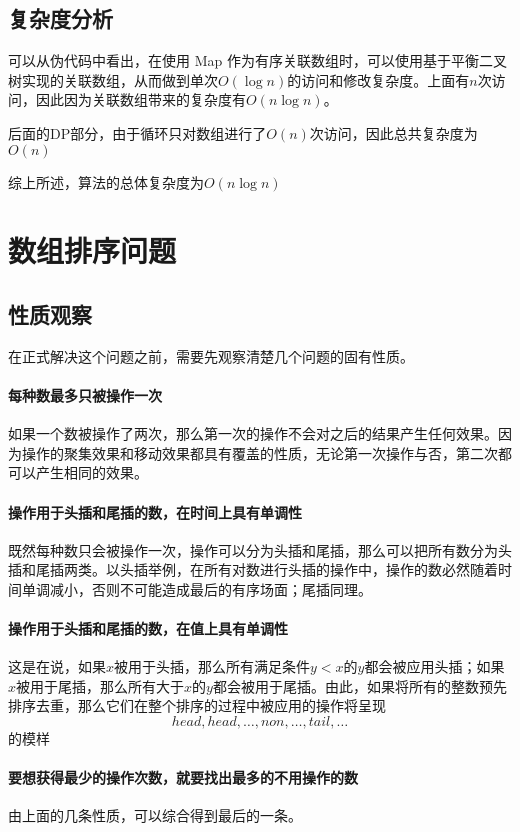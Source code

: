 \documentclass[UTF8]{ctexart}
\begin{document}
    \subsection*{复杂度分析}
        可以从伪代码中看出，在使用 Map 作为有序关联数组时，可以使用基于平衡二叉树实现的关联数组，从而做到单次$O(\log n)$的访问和修改复杂度。上面有$n$次访问，因此因为关联数组带来的复杂度有$O(n\log n)$。

        后面的DP部分，由于循环只对数组进行了$O(n)$次访问，因此总共复杂度为$O(n)$

        综上所述，算法的总体复杂度为$O(n \log n)$

\section{数组排序问题} %
    \subsection*{性质观察}
        在正式解决这个问题之前，需要先观察清楚几个问题的固有性质。
        
        \paragraph*{每种数最多只被操作一次}
            如果一个数被操作了两次，那么第一次的操作不会对之后的结果产生任何效果。因为操作的聚集效果和移动效果都具有覆盖的性质，无论第一次操作与否，第二次都可以产生相同的效果。

        \paragraph*{操作用于头插和尾插的数，在时间上具有单调性}
            既然每种数只会被操作一次，操作可以分为头插和尾插，那么可以把所有数分为头插和尾插两类。以头插举例，在所有对数进行头插的操作中，操作的数必然随着时间单调减小，否则不可能造成最后的有序场面；尾插同理。

        \paragraph*{操作用于头插和尾插的数，在值上具有单调性}
            这是在说，如果$x$被用于头插，那么所有满足条件$y<x$的$y$都会被应用头插；如果$x$被用于尾插，那么所有大于$x$的$y$都会被用于尾插。由此，如果将所有的整数预先排序去重，那么它们在整个排序的过程中被应用的操作将呈现
            $$head, head, \dots, non, \dots, tail, \dots$$
            的模样

        \paragraph*{要想获得最少的操作次数，就要找出最多的不用操作的数}
            由上面的几条性质，可以综合得到最后的一条。
    
\end{document}
